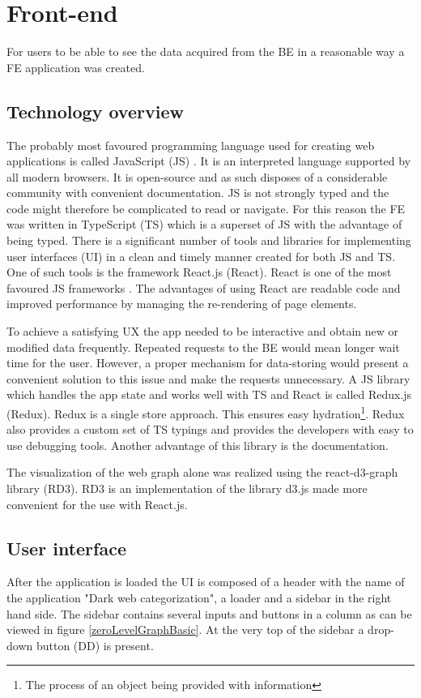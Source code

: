 \section{Front-end}
For users to be able to see the data acquired from the BE in a reasonable way a FE application was created. 
\subsection{Technology overview}
The probably most favoured programming language used for creating web applications \cite{jsGithut} is called JavaScript (JS) \cite{javaScript}. It is an interpreted language supported by all modern browsers. It is open-source and as such disposes of a considerable community with convenient documentation. JS is not strongly typed and the code might therefore be complicated to read or navigate. For this reason the FE was written in TypeScript (TS) \cite{typeScript} which is a superset of JS with the advantage of being typed. There is a significant number of tools and libraries for implementing user interfaces (UI) in a clean and timely manner created for both JS and TS. One of such tools is the framework React.js \cite{react} (React). React is one of the most favoured JS frameworks \cite{reactPopularity}. The advantages of using React are readable code and improved performance by managing the re-rendering of page elements.

To achieve a satisfying UX the app needed to be interactive and obtain new or modified data frequently. Repeated requests to the BE would mean longer wait time for the user. However, a proper mechanism for data-storing would present a convenient solution to this issue and make the requests unnecessary. A JS library which handles the app state and works well with TS and React is called Redux.js \cite{redux} (Redux). Redux is a single store approach. This ensures easy hydration\footnote{The process of an object being provided with information}. Redux also provides a custom set of TS typings and provides the developers with easy to use debugging tools. Another advantage of this library is the documentation.

The visualization of the web graph alone was realized using the react-d3-graph library \cite{reactD3Graph} (RD3). RD3 is 
an implementation of the library d3.js \cite{d3} made more convenient for the use with React.js. 

\subsection{User interface}
After the application is loaded the UI is composed of a header with the name of the application "Dark web categorization", a loader and a sidebar in the right hand side. The sidebar contains several inputs and buttons in a column as can be viewed in figure \ref{zeroLevelGraphBasic}. At the very top of the sidebar a drop-down button (DD) is present. 


